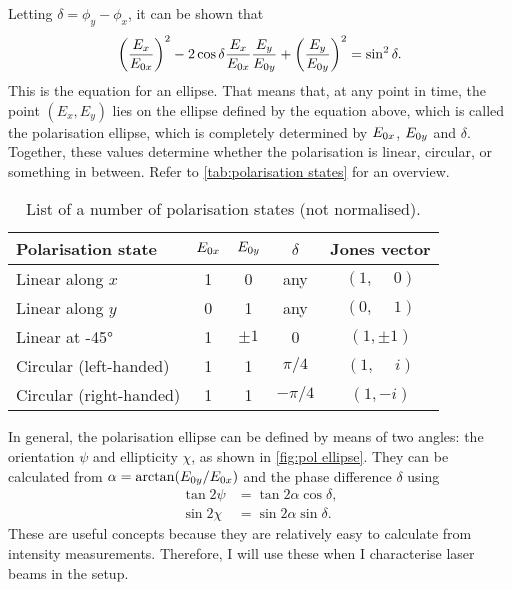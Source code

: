Letting $ \delta = \phi_y-\phi_x $, it can be shown that 
\begin{equation}
	\left(\frac{E_x}{E_{0x}}\right)^2 - 2\cos\delta\frac{E_x}{E_{0x}}\frac{E_y}{E_{0y}} + \left(\frac{E_y}{E_{0y}}\right)^2 = \sin^2\delta.
\end{equation}
This is the equation for an ellipse. That means that, at any point in time, the point $ (E_x, E_y) $ lies on the ellipse defined by the equation above, which is called the polarisation ellipse, which is completely determined by $ E_{0x} $, $ E_{0y} $ and $ \delta $. Together, these values determine whether the polarisation is linear, circular, or something in between. Refer to \autoref{tab:polarisation states} for an overview.

\begin{table}
	\centering
	\begin{tabular}{lcccc}
		\toprule
		Polarisation state      & $ E_{0x} $ & $ E_{0y} $ & $ \delta $ &     Jones vector      \\ \midrule
		Linear along $ x $      &    1     &    0     &    any     & $ (1, \phantom{-}0) $ \\
		Linear along $ y $      &    0     &    1     &    any     & $ (0, \phantom{-}1) $ \\
		Linear at \ang{+-45}    &    1     & $ \pm1 $ &     0      &     $ (1, \pm1) $     \\
		Circular (left-handed)  &    1     &    1     & $ \pi/4 $  & $ (1, \phantom{-}i) $ \\
		Circular (right-handed) &    1     &    1     & $ -\pi/4 $ &      $ (1, -i) $      \\ \bottomrule
	\end{tabular}
	\caption{List of a number of polarisation states (not normalised).}
	\label{tab:polarisation states}
\end{table}


In general, the polarisation ellipse can be defined by means of two angles: the orientation $ \psi $ and ellipticity $ \chi $, as shown in \autoref{fig:pol ellipse}. They can be calculated from $ \alpha = \arctan(E_{0y}/E_{0x}) $ and the phase difference $ \delta $ using
\begin{align}
	\tan 2\psi &= \tan 2\alpha \cos \delta,\\
	\sin 2\chi &= \sin 2\alpha \sin \delta.
\end{align}
These are useful concepts because they are relatively easy to calculate from intensity measurements. Therefore, I will use these when I characterise laser beams in the setup.

